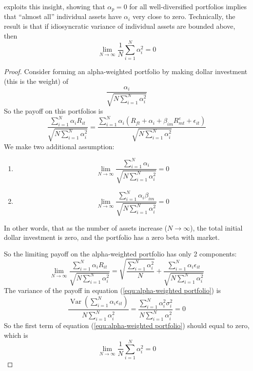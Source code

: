 \documentclass[11pt,green,twocol,citestyle=authoryear, bibstyle=authoryear]{elegantbook}
\begin{document}
\cite{Ross_1976} exploits this insight, showing that $ \alpha_p = 0 $ for all well-diversified portfolios implies that ``almost all'' individual assets have $ \alpha_i $ very close to zero. Technically, the result is that if idiosyncratic variance of individual assets are bounded above, then
\begin{equation*}
    \lim _{N \rightarrow \infty} \frac{1}{N} \sum_{i=1}^N \alpha_i^2=0
\end{equation*}
\begin{proof}
    Consider forming an alpha-weighted portfolio by making dollar investment (this is the weight) of 
    \begin{equation*}
        \frac{\alpha_i}{\sqrt{N \sum_{i=1}^N \alpha_i^2}}
    \end{equation*}
    So the payoff on this portfolios is 
    \begin{equation*}
        \frac{\sum_{i=1}^N \alpha_i R_{i t}}{\sqrt{N \sum_{i=1}^N \alpha_i^2}}=\frac{\sum_{i=1}^N \alpha_i\left(R_{f t}+\alpha_i+\beta_{i m} R_{m t}^e+\epsilon_{i t}\right)}{\sqrt{N \sum_{i=1}^N \alpha_i^2}}
    \end{equation*}
    We make two additional assumption: 
    \begin{enumerate}
        \item \begin{equation*}
            \lim _{N \rightarrow \infty} \frac{\sum_{i=1}^N \alpha_i}{\sqrt{N \sum_{i=1}^N \alpha_i^2}}=0
        \end{equation*}
        \item \begin{equation*}
            \lim _{N \rightarrow \infty} \frac{\sum_{i=1}^N \alpha_i \beta_{i m}}{\sqrt{N \sum_{i=1}^N \alpha_i^2}}=0
        \end{equation*}
    \end{enumerate}
    In other words, that as the number of assets increase ($ N \rightarrow \infty  $), the total initial dollar investment is zero, and the portfolio has a zero beta with market.

    So the limiting payoff on the alpha-weighted portfolio has only 2 components:
    \begin{equation}\label{equ:alpha-weighted portfolio}
        \lim _{N \rightarrow \infty} \frac{\sum_{i=1}^N \alpha_i R_{i t}}{\sqrt{N \sum_{i=1}^N \alpha_i^2}}=\sqrt{\frac{\sum_{i=1}^N \alpha_i^2}{N}}+\frac{\sum_{i=1}^N \alpha_i \epsilon_{i t}}{\sqrt{N \sum_{i=1}^N \alpha_i^2}}
    \end{equation}
    The variance of the payoff in equation (\ref{equ:alpha-weighted portfolio}) is 
    \begin{equation*}
        \frac{\operatorname{Var}\left(\sum_{i=1}^N \alpha_i \epsilon_{i t}\right)}{N \sum_{i=1}^N \alpha_i^2}=\frac{\sum_{i=1}^N \alpha_i^2 \sigma_i^2}{N \sum_{i=1}^N \alpha_i^2} = 0
    \end{equation*}
    So the first term of equation (\ref{equ:alpha-weighted portfolio}) should equal to zero, which is 
    \begin{equation*}
        \lim _{N \rightarrow \infty} \frac{1}{N} \sum_{i=1}^N \alpha_i^2=0 
    \end{equation*}
\end{proof}
\end{document}
